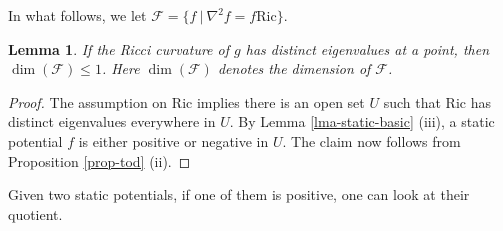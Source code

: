 \documentclass[12pt]{amsart}
\newtheorem{lma}{Lemma}[section]
\theoremstyle{remark}
\numberwithin{equation}{section}
\newcommand{\Ric}{\mbox{Ric}}
\def\K{\mathcal{F}}
\begin{document}
In what follows, we  let   $ \K = \{ f \ | \ \nabla^2 f = f \Ric \}$. 


\begin{lma} \label{lma-distinct}
If  the Ricci curvature of $g$  has distinct eigenvalues at a point, then $ \dim (\K) \le 1 $.
Here $ \dim (\K)$ denotes the dimension of $\K$. 
\end{lma}

\begin{proof}
The assumption on $ \Ric$  implies there is an open set $U$ such that
 $\Ric $ has distinct eigenvalues everywhere in $U$.
By  Lemma \ref{lma-static-basic} (iii),  a static potential $f$ is either positive or negative  in  $U$.
The claim now follows from  Proposition \ref{prop-tod} (ii).
 \end{proof}


Given two static potentials, if one of them is positive, one can look at their  quotient.
\end{document}

